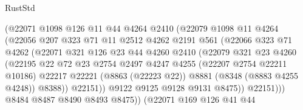 \begin{lexlean}{RustStd}
\begin{coremodule}
                          (@22071
                            @1098
                            @126
                            @11
                            @44
                            @4264
                            @2410
                            (@22079
                              @1098
                              @11
                              @4264
                              (@22056
                                @207
                                @323
                                @71
                                @11
                                @2512
                                @4262
                                @2191
                                @561
                                (@22066
                                  @323
                                  @71
                                  @4262
                                  (@22071
                                    @321
                                    @126
                                    @23
                                    @44
                                    @4260
                                    @2410
                                    (@22079
                                      @321
                                      @23
                                      @4260
                                      (@22195
                                        @22
                                        @72
                                        @23
                                        @2754
                                        @2497
                                        @4247
                                        @4255
                                        (@22207 @2754 @22211 @10186)
                                        @22217
                                        @22221
                                        (@8863 (@22223 @22))
                                        @8881
                                        (@8348 (@8883 @4255 @4248))
                                        @8388))
                                    @22151))
                                @9122
                                @9125
                                @9128
                                @9131
                                @8475))
                            @22151)))
                      @8484
                      @8487
                      @8490
                      @8493
                      @8475))
                  (@22071
                    @169
                    @126
                    @41
                    @44

\end{coremodule}
\end{lexlean}
